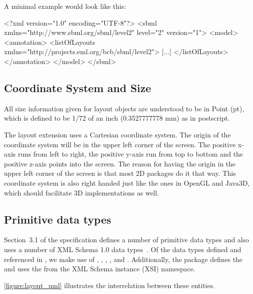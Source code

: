 \begin{center}
\end{center}

A minimal example would look like this: 

\begin{example}
<?xml version="1.0" encoding="UTF-8"?>
 <sbml xmlns="http://www.sbml.org/sbml/level2" level="2" version="1">
   <model>
	  <annotation>
		  <listOfLayouts xmlns="http://projects.eml.org/bcb/sbml/level2">
			 [...]
			</listOfLayouts>
		</annotation>
	 </model>
	</sbml>
\end{example}

\subsection{Coordinate System and Size} All size information given for 
layout objects are understood to be in Point (pt), which is defined to be 1/72 of an inch (0.3527777778 
mm) as in postscript. 

The layout extension uses a Cartesian coordinate system. The origin of 
the coordinate system will be in the upper left corner of the screen. 
The positive x-axis runs from left to right, the positive y-axis run 
from top to bottom and the positive z-axis points into the screen. The 
reason for having the origin in the upper left corner of the screen is 
that most 2D packages do it that way. This coordinate system is also 
right handed just like the ones in OpenGL and Java3D, which should 
facilitate 3D implementations as well. 

\subsection{Primitive data types} \label{primtypes} 

Section~3.1 of the \sbmlthreecore specification defines a number of 
primitive data types and also uses a number of XML Schema 1.0 data 
types~\citep{biron:2000}. Of the data types defined and referenced in 
\sbmlthreecore, we make use of  , , 
, ,  and 
. Additionally, the \Layout package defines the 
 and uses the  
from the XML Schema instance (XSI) namespace.

\ref{figure:layout_uml} illustrates the interrelation between these entities.

